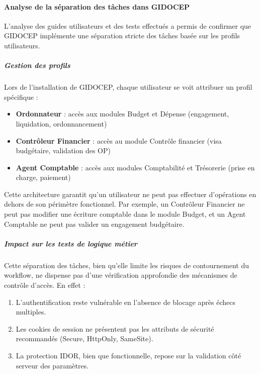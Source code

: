 \documentclass[12pt,a4paper,oneside]{report}
\begin{document}
\paragraph{Analyse de la séparation des tâches dans GIDOCEP}

L'analyse des guides utilisateurs et des tests effectués a permis 
de confirmer que GIDOCEP implémente une séparation stricte des 
tâches basée sur les profils utilisateurs.

\subparagraph{Gestion des profils}

Lors de l'installation de GIDOCEP, chaque utilisateur se voit 
attribuer un profil spécifique :

\begin{itemize}[label={\color{gold}}, leftmargin=*]
	\item \textbf{Ordonnateur} : accès aux modules Budget et Dépense 
	(engagement, liquidation, ordonnancement)
	
	\item \textbf{Contrôleur Financier} : accès au module Contrôle 
	financier (visa budgétaire, validation des OP)
	
	\item \textbf{Agent Comptable} : accès aux modules Comptabilité 
	et Trésorerie (prise en charge, paiement)
\end{itemize}

Cette architecture garantit qu'un utilisateur ne peut pas effectuer 
d'opérations en dehors de son périmètre fonctionnel. Par exemple, 
un Contrôleur Financier ne peut pas modifier une écriture comptable 
dans le module Budget, et un Agent Comptable ne peut pas valider 
un engagement budgétaire.

\subparagraph{Impact sur les tests de logique métier}

Cette séparation des tâches, bien qu'elle limite les risques de 
contournement du workflow, ne dispense pas d'une vérification 
approfondie des mécanismes de contrôle d'accès. En effet :

\begin{enumerate}[label={\color{orange}\ding{53}}]
	\item L'authentification reste vulnérable en l'absence de 
	blocage après échecs multiples.
	
	\item Les cookies de session ne présentent pas les attributs 
	de sécurité recommandés (Secure, HttpOnly, SameSite).
	
	\item La protection IDOR, bien que fonctionnelle, repose sur 
	la validation côté serveur des paramètres.
\end{enumerate}
\end{document}
